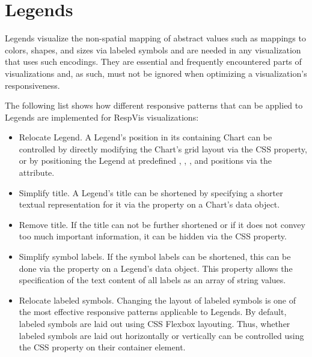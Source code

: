\section{Legends}
\label{sec:LegendsUsage}

Legends visualize the non-spatial mapping of abstract values such as mappings to colors, shapes, and sizes via labeled symbols and are needed in any visualization that uses such encodings.
They are essential and frequently encountered parts of visualizations and, as such, must not be ignored when optimizing a visualization's responsiveness. 

The following list shows how different responsive patterns that can be applied to Legends are implemented for RespVis visualizations: 

\begin{itemize}

\item
Relocate Legend.
A Legend's position in its containing Chart can be controlled by directly modifying the Chart's grid layout via the CSS  property, or by positioning the Legend at predefined , , , and  positions via the  attribute.

\item
Simplify title.
A Legend's title can be shortened by specifying a shorter textual representation for it via the  property on a Chart's data object.

\item
Remove title.
If the title can not be further shortened or if it does not convey too much important information, it can be hidden via the CSS  property.

\item
Simplify symbol labels.
If the symbol labels can be shortened, this can be done via the  property on a Legend's data object.
This property allows the specification of the text content of all labels as an array of string values.

\item
Relocate labeled symbols.
Changing the layout of labeled symbols is one of the most effective responsive patterns applicable to Legends.
By default, labeled symbols are laid out using CSS Flexbox layouting.
Thus, whether labeled symbols are laid out horizontally or vertically can be controlled using the CSS  property on their container element.

\end{itemize}

